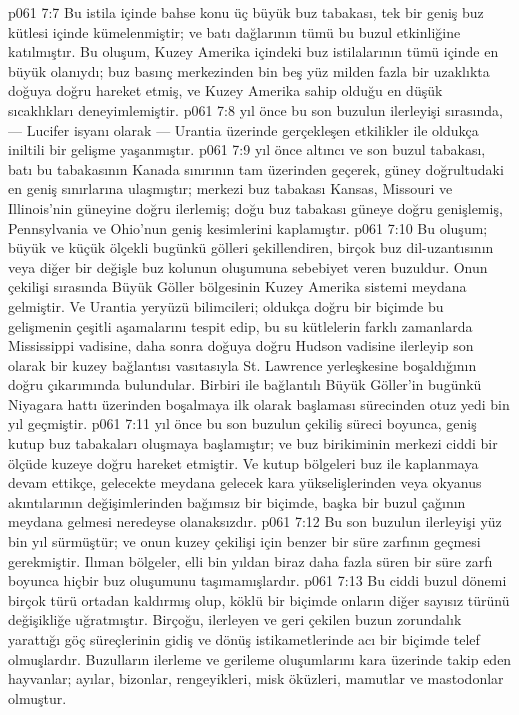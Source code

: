 \vs p061 7:7 Bu istila içinde bahse konu üç büyük buz tabakası, tek bir geniş buz kütlesi içinde kümelenmiştir; ve batı dağlarının tümü bu buzul etkinliğine katılmıştır. Bu oluşum, Kuzey Amerika içindeki buz istilalarının tümü içinde en büyük olanıydı; buz basınç merkezinden bin beş yüz milden fazla bir uzaklıkta doğuya doğru hareket etmiş, ve Kuzey Amerika sahip olduğu en düşük sıcaklıkları deneyimlemiştir.
\vs p061 7:8  yıl önce bu son buzulun ilerleyişi sırasında, --- Lucifer isyanı olarak --- Urantia üzerinde gerçekleşen etkilikler ile oldukça iniltili bir gelişme yaşanmıştır.
\vs p061 7:9  yıl önce altıncı ve son buzul tabakası, batı bu tabakasının Kanada sınırının tam üzerinden geçerek, güney doğrultudaki en geniş sınırlarına ulaşmıştır; merkezi buz tabakası Kansas, Missouri ve Illinois’nin güneyine doğru ilerlemiş; doğu buz tabakası güneye doğru genişlemiş, Pennsylvania ve Ohio’nun geniş kesimlerini kaplamıştır.
\vs p061 7:10 Bu oluşum; büyük ve küçük ölçekli bugünkü gölleri şekillendiren, birçok buz dil\hyp{}uzantısının veya diğer bir değişle buz kolunun oluşumuna sebebiyet veren buzuldur. Onun çekilişi sırasında Büyük Göller bölgesinin Kuzey Amerika sistemi meydana gelmiştir. Ve Urantia yeryüzü bilimcileri; oldukça doğru bir biçimde bu gelişmenin çeşitli aşamalarını tespit edip, bu su kütlelerin farklı zamanlarda Mississippi vadisine, daha sonra doğuya doğru Hudson vadisine ilerleyip son olarak bir kuzey bağlantısı vasıtasıyla St. Lawrence yerleşkesine boşaldığının doğru çıkarımında bulundular. Birbiri ile bağlantılı Büyük Göller’in bugünkü Niyagara hattı üzerinden boşalmaya ilk olarak başlaması sürecinden otuz yedi bin yıl geçmiştir.
\vs p061 7:11  yıl önce bu son buzulun çekiliş süreci boyunca, geniş kutup buz tabakaları oluşmaya başlamıştır; ve buz birikiminin merkezi ciddi bir ölçüde kuzeye doğru hareket etmiştir. Ve kutup bölgeleri buz ile kaplanmaya devam ettikçe, gelecekte meydana gelecek kara yükselişlerinden veya okyanus akıntılarının değişimlerinden bağımsız bir biçimde, başka bir buzul çağının meydana gelmesi neredeyse olanaksızdır.
\vs p061 7:12 Bu son buzulun ilerleyişi yüz bin yıl sürmüştür; ve onun kuzey çekilişi için benzer bir süre zarfının geçmesi gerekmiştir. Ilıman bölgeler, elli bin yıldan biraz daha fazla süren bir süre zarfı boyunca hiçbir buz oluşumunu taşımamışlardır.
\vs p061 7:13 Bu ciddi buzul dönemi birçok türü ortadan kaldırmış olup, köklü bir biçimde onların diğer sayısız türünü değişikliğe uğratmıştır. Birçoğu, ilerleyen ve geri çekilen buzun zorundalık yarattığı göç süreçlerinin gidiş ve dönüş istikametlerinde acı bir biçimde telef olmuşlardır. Buzulların ilerleme ve gerileme oluşumlarını kara üzerinde takip eden hayvanlar; ayılar, bizonlar, rengeyikleri, misk öküzleri, mamutlar ve mastodonlar olmuştur.
